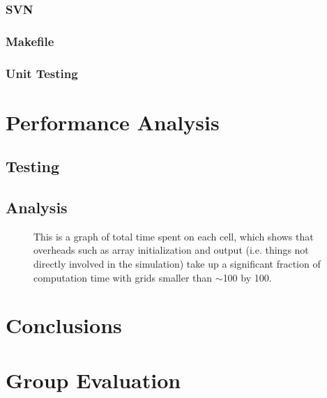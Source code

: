 \documentclass[12pt]{report}
\begin{document}
      \subsection{SVN} %
      \subsection{Makefile} %
      \subsection{Unit Testing} %

\chapter{Performance Analysis}
   \section{Testing} %
   \section{Analysis} %
   
   \begin{figure}[h]
   
   
   \caption{This is a graph of total time spent on each cell, which shows that overheads such as array initialization
   and output (i.e. things not directly involved in the simulation) take up a significant fraction of computation
   time with grids smaller than $\sim$100 by 100.}
   \end{figure}

\chapter{Conclusions} %

\chapter{Group Evaluation} %
\end{document}
